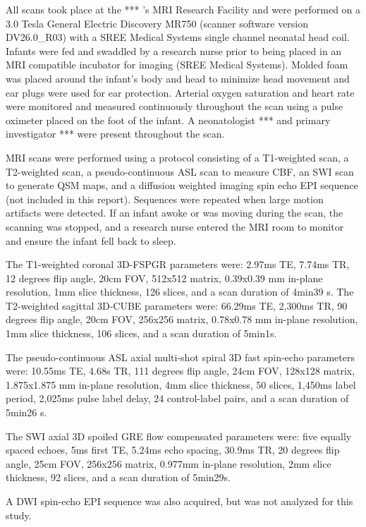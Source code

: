 \documentclass[
  letterpaper,
  DIV=11,
  numbers=noendperiod]{scrartcl}
\begin{document}
All scans took place at the *** 's MRI Research Facility and were
performed on a 3.0 Tesla General Electric Discovery MR750 (scanner
software version DV26.0\_R03) with a SREE Medical Systems single channel
neonatal head coil. Infants were fed and swaddled by a research nurse
prior to being placed in an MRI compatible incubator for imaging (SREE
Medical Systems). Molded foam was placed around the infant's body and
head to minimize head movement and ear plugs were used for ear
protection. Arterial oxygen saturation and heart rate were monitored and
measured continuously throughout the scan using a pulse oximeter placed
on the foot of the infant. A neonatologist *** and primary investigator
*** were present throughout the scan.

MRI scans were performed using a protocol consisting of a T1-weighted
scan, a T2-weighted scan, a pseudo-continuous ASL scan to measure CBF,
an SWI scan to generate QSM maps, and a diffusion weighted imaging spin
echo EPI sequence (not included in this report). Sequences were repeated
when large motion artifacts were detected. If an infant awoke or was
moving during the scan, the scanning was stopped, and a research nurse
entered the MRI room to monitor and ensure the infant fell back to
sleep.

The T1-weighted coronal 3D-FSPGR parameters were: 2.97ms TE, 7.74ms TR,
12 degrees flip angle, 20cm FOV, 512x512 matrix, 0.39x0.39 mm in-plane
resolution, 1mm slice thickness, 126 slices, and a scan duration of
4min39 s. The T2-weighted sagittal 3D-CUBE parameters were: 66.29ms TE,
2,300ms TR, 90 degrees flip angle, 20cm FOV, 256x256 matrix, 0.78x0.78
mm in-plane resolution, 1mm slice thickness, 106 slices, and a scan
duration of 5min1s.

The pseudo-continuous ASL axial multi-shot spiral 3D fast spin-echo
parameters were: 10.55ms TE, 4.68s TR, 111 degrees flip angle, 24cm FOV,
128x128 matrix, 1.875x1.875 mm in-plane resolution, 4mm slice thickness,
50 slices, 1,450ms label period, 2,025ms pulse label delay, 24
control-label pairs, and a scan duration of 5min26 s.

The SWI axial 3D spoiled GRE flow compensated parameters were: five
equally spaced echoes, 5ms first TE, 5.24ms echo spacing, 30.9ms TR, 20
degrees flip angle, 25cm FOV, 256x256 matrix, 0.977mm in-plane
resolution, 2mm slice thickness, 92 slices, and a scan duration of
5min29s.

A DWI spin-echo EPI sequence was also acquired, but was not analyzed for
this study.
\end{document}
